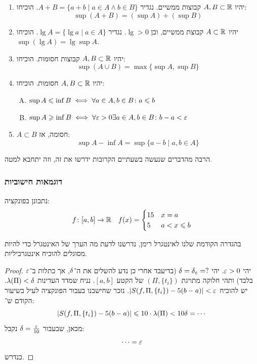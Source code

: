 \documentclass[name=רשימות חדו''א 2א]{../../../tex/classes/noChapterMegasumPreamble}
\begin{document}
	\begin{Exercise}
		\begin{enumerate}
			\item יהיו $A, B \subset \mathbb{R}$ קבוצות ממשיים. נגדיר $A + B = \{a + b \mid a\in A \land b \in B\}$. הוכיחו:
			\[ \sup (A + B) = (\sup A) + (\sup B) \]
			\item יהיו $A \subset \mathbb{R}$ קבוצת ממשיים, וכן $\lg > 0$. נגדיר $\lg A = \{ \lg a \mid a \in A\}$. הוכיחו $\sup(\lg A) = \lg \sup A$.
			\item יהיו $A, B \subset \mathbb{R}$ קבוצות חסומות. הוכיחו:
			\[ \sup (A \cup B) = \max\{\sup A, \sup B\} \]
			\item יהיו $A, B \subset \mathbb{R}$ חסומות. הוכיחו:
			\begin{enumerate}[A.]
				\item \hfil $\sup A \leqslant \inf B \iff \forall a \in A, b \in B\colon a \leqslant b$
				\item \hfil $\sup A \ge \inf B \iff \forall \eg > 0 \exists a \in A, b \in B \co b - a < \eg$
			\end{enumerate}
			\item $A \subset B$ חסומה, אז:
			\[ \sup A - \inf A = \sup\{a - b \mid a, b \in A\} \]
		\end{enumerate}
	\end{Exercise}
	הרבה מהדברים שנעשה בשעתיים הקרובות ידרשו את זה, וזה יתחבא למטה.

\subsubsection{דוגמאות חישוביות}
	נתבונן בפונקציה:
	\begin{align*}
		f \colon [a, b] \to \mathbb{R} && f(x) = \begin{cases}
			15 & x = a \\
			5 & a < x \leqslant b
		\end{cases}
	\end{align*}

	בהגדרה הקודמת שלנו לאינטגרל רימן, נדרשנו לדעת מה הערך של האינטגרל כדי להיות מסוגלים להוכיח אינטגרביליות.
	\begin{proof}
		יהי $\eg > 0$. יהי $\dg  = \dg_\eg = ?$ (בדיעבד אחרי כן נדע להשלים את ה־$\delta$, אך כתלות ב־$\eg$ בלבד) ותהי חלוקה מתויגת $(\Pi, \{t_i\})$ של הקטע $[a, b]$. נניח שמדד העדינות $\lambda(\Pi) < \delta$. יש להוכיח $\sof{S(f, \Pi, \{t_i\}) - 5(b - a)} < \eg$. נזכר שחישבנו בעבור הפונקציה לעיל בשיעור הקודם ש־:
		\[ \left \lvert S(f, \Pi, \{t_i\}) - 5(b-a) \right \rvert \leqslant 10 \cdot \lambda(\Pi) < 10 \delta = \cdots \]
		מכאן, שבעבור $\dg = \frac{\eg}{10}$ נקבל:
		\[ \cdots = \eg \]
		כנדרש.
	\end{proof}
\end{document}
